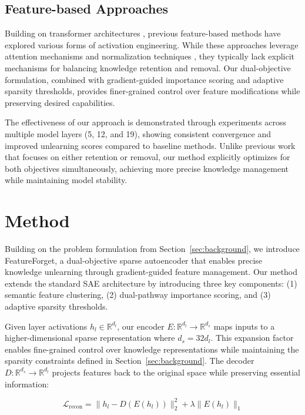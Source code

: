 \documentclass{article} %
\begin{document}
\subsection{Feature-based Approaches}
Building on transformer architectures \cite{vaswani2017attention}, previous feature-based methods have explored various forms of activation engineering. While these approaches leverage attention mechanisms \cite{bahdanau2014neural} and normalization techniques \cite{ba2016layer}, they typically lack explicit mechanisms for balancing knowledge retention and removal. Our dual-objective formulation, combined with gradient-guided importance scoring and adaptive sparsity thresholds, provides finer-grained control over feature modifications while preserving desired capabilities.

The effectiveness of our approach is demonstrated through experiments across multiple model layers (5, 12, and 19), showing consistent convergence and improved unlearning scores compared to baseline methods. Unlike previous work that focuses on either retention or removal, our method explicitly optimizes for both objectives simultaneously, achieving more precise knowledge management while maintaining model stability.


\section{Method}
\label{sec:method}

Building on the problem formulation from Section~\ref{sec:background}, we introduce FeatureForget, a dual-objective sparse autoencoder that enables precise knowledge unlearning through gradient-guided feature management. Our method extends the standard SAE architecture by introducing three key components: (1) semantic feature clustering, (2) dual-pathway importance scoring, and (3) adaptive sparsity thresholds.

Given layer activations $h_l \in \mathbb{R}^{d_l}$, our encoder $E: \mathbb{R}^{d_l} \rightarrow \mathbb{R}^{d_s}$ maps inputs to a higher-dimensional sparse representation where $d_s = 32d_l$. This expansion factor enables fine-grained control over knowledge representations while maintaining the sparsity constraints defined in Section~\ref{sec:background}. The decoder $D: \mathbb{R}^{d_s} \rightarrow \mathbb{R}^{d_l}$ projects features back to the original space while preserving essential information:

\begin{equation}
\label{eq:reconstruction}
\mathcal{L}_{\text{recon}} = \|h_l - D(E(h_l))\|_2^2 + \lambda\|E(h_l)\|_1
\end{equation}
\end{document}
